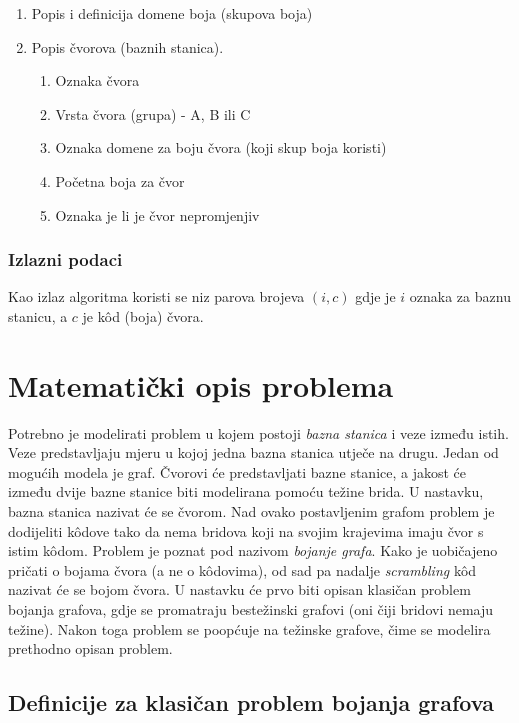 \documentclass[times, utf8, diplomski, numeric]{fer}
\begin{document}
\begin{enumerate}
	\item Popis i definicija domene boja (skupova boja)
	\item Popis čvorova (baznih stanica).
		\begin{enumerate}
			\item Oznaka čvora
			\item Vrsta čvora (grupa) - A, B ili C
			\item Oznaka domene za boju čvora (koji skup boja koristi)
			\item Početna boja za čvor
			\item Oznaka je li je čvor nepromjenjiv
		\end{enumerate}
\end{enumerate} 

\subsubsection{Izlazni podaci}

Kao izlaz algoritma koristi se niz parova brojeva $(i, c)$ gdje je $i$ oznaka za baznu stanicu, a $c$ je k\^{o}d (boja) čvora.

\section{Matematički opis problema}

Potrebno je modelirati problem u kojem postoji \emph{bazna stanica} i veze između istih. Veze predstavljaju mjeru u kojoj jedna bazna stanica utječe na drugu. Jedan od mogućih modela je graf. Čvorovi će predstavljati bazne stanice, a jakost će između dvije bazne stanice biti modelirana pomoću težine brida. U nastavku, bazna stanica nazivat će se čvorom. Nad ovako postavljenim grafom problem je dodijeliti k\^{o}dove tako da nema bridova koji na svojim krajevima imaju čvor s istim k\^{o}dom. Problem je poznat pod nazivom \emph{bojanje grafa}. Kako je uobičajeno pričati o bojama čvora (a ne o k\^{o}dovima), od sad pa nadalje \emph{scrambling} k\^{o}d nazivat će se bojom čvora. U nastavku će prvo biti opisan klasičan problem bojanja grafova, gdje se promatraju bestežinski grafovi (oni čiji bridovi nemaju težine). Nakon toga problem se poopćuje na težinske grafove, čime se modelira prethodno opisan problem.

\subsection{Definicije za klasičan problem bojanja grafova}
\end{document}
